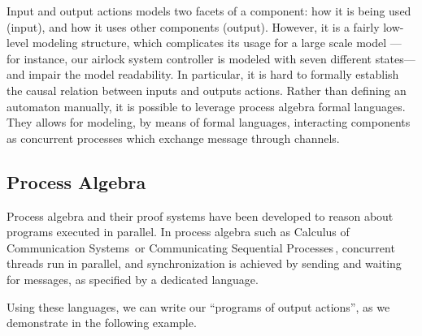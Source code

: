 Input and output actions models two facets of a component: how it is being used
(input), and how it uses other components (output).
%
However, it is a fairly low-level modeling structure, which complicates its
usage for a large scale model --- for instance, our airlock system controller is
modeled with seven different states--- and impair the model readability.
%
In particular, it is hard to formally establish the causal relation between
inputs and outputs actions.
%
Rather than defining an automaton manually, it is possible to leverage process
algebra formal languages.
%
They allows for modeling, by means of formal languages, interacting components
as concurrent processes which exchange message through channels.

\subsection{Process Algebra}
\label{subsec:sota:palgebra}

Process algebra and their proof systems have been developed to reason about
programs executed in parallel.
%
In process algebra such as Calculus of Communication
Systems\,\cite{milner1980ccs} or Communicating Sequential
Processes\,\cite{hoare1978csp}, concurrent threads run in parallel, and
synchronization is achieved by sending and waiting for messages, as specified by
a dedicated language.

Using these languages, we can write our ``programs of output actions'', as we
demonstrate in the following example.

